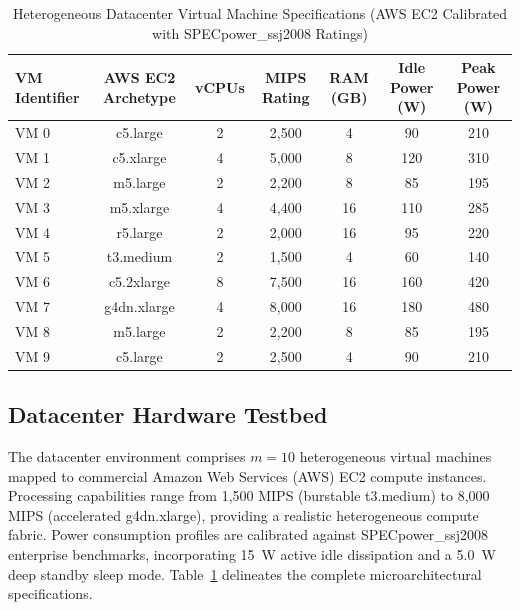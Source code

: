 \documentclass[default,sn-mathphys-num]{sn-jnl}
\theoremstyle{thmstyleone}
\theoremstyle{thmstyletwo}
\theoremstyle{thmstylethree}
\begin{document}
\begin{table}[t]
\caption{Heterogeneous Datacenter Virtual Machine Specifications (AWS EC2 Calibrated with SPECpower\_ssj2008 Ratings)}\label{tab:vm_specs}
\centering
\small
\begin{tabular*}{\textwidth}{@{\extracolsep{\fill}}lcccccc@{\extracolsep{\fill}}}
\toprule
\textbf{VM Identifier} & \textbf{AWS EC2 Archetype} & \textbf{vCPUs} & \textbf{MIPS Rating} & \textbf{RAM (GB)} & \textbf{Idle Power (W)} & \textbf{Peak Power (W)} \\
\midrule
VM 0 & c5.large & 2 & 2,500 & 4 & 90 & 210 \\
VM 1 & c5.xlarge & 4 & 5,000 & 8 & 120 & 310 \\
VM 2 & m5.large & 2 & 2,200 & 8 & 85 & 195 \\
VM 3 & m5.xlarge & 4 & 4,400 & 16 & 110 & 285 \\
VM 4 & r5.large & 2 & 2,000 & 16 & 95 & 220 \\
VM 5 & t3.medium & 2 & 1,500 & 4 & 60 & 140 \\
VM 6 & c5.2xlarge & 8 & 7,500 & 16 & 160 & 420 \\
VM 7 & g4dn.xlarge & 4 & 8,000 & 16 & 180 & 480 \\
VM 8 & m5.large & 2 & 2,200 & 8 & 85 & 195 \\
VM 9 & c5.large & 2 & 2,500 & 4 & 90 & 210 \\
\bottomrule
\end{tabular*}
\end{table}

\subsection{Datacenter Hardware Testbed}
The datacenter environment comprises $m = 10$ heterogeneous virtual machines mapped to commercial Amazon Web Services (AWS) EC2 compute instances. Processing capabilities range from 1,500 MIPS (burstable t3.medium) to 8,000 MIPS (accelerated g4dn.xlarge), providing a realistic heterogeneous compute fabric. Power consumption profiles are calibrated against SPECpower\_ssj2008 enterprise benchmarks, incorporating 15~W active idle dissipation and a 5.0~W deep standby sleep mode. Table~\ref{tab:vm_specs} delineates the complete microarchitectural specifications.
\end{document}
